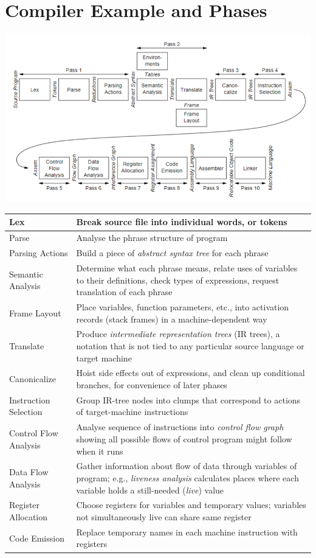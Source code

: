 \documentclass[10pt]{article}
\begin{document}
\section*{Compiler Example and Phases}
\begin{center}
    \includegraphics*[scale=0.8]{W1_7.png}
\end{center}
\begin{tabular}{| p{3.5cm} | p{12cm} |}
    \hline
    Lex & Break source file into individual words, or tokens \\
    \hline
    Parse & Analyse the phrase structure of program \\
    \hline
    Parsing Actions & Build a piece of \textit{abstract syntax tree} for each phrase \\
    \hline
    Semantic Analysis & Determine what each phrase means, relate uses of variables to their definitions, check types of expressions, request translation of each phrase\\
    \hline
    Frame Layout & Place variables, function parameters, etc., into activation records (stack frames) in a machine-dependent way\\
    \hline
    Translate & Produce \textit{intermediate representation trees} (IR trees), a notation that is not tied to any particular source language or target machine\\
    \hline
    Canonicalize & Hoist side effects out of expressions, and clean up conditional branches, for convenience of later phases\\
    \hline
    Instruction Selection & Group IR-tree nodes into clumps that correspond to actions of target-machine instructions\\
    \hline
    Control Flow Analysis & Analyse sequence of instructions into \textit{control flow graph} showing all possible flows of control program might follow when it runs\\
    \hline
    Data Flow Analysis & Gather information about flow of data through variables of program; e.g., \textit{liveness analysis} calculates places where each variable holds a still-needed (\textit{live}) value\\
    \hline
    Register Allocation & Choose registers for variables and temporary values; variables not simultaneously live can share same register\\
    \hline
    Code Emission & Replace temporary names in each machine instruction with registers\\
    \hline
\end{tabular}
\end{document}
